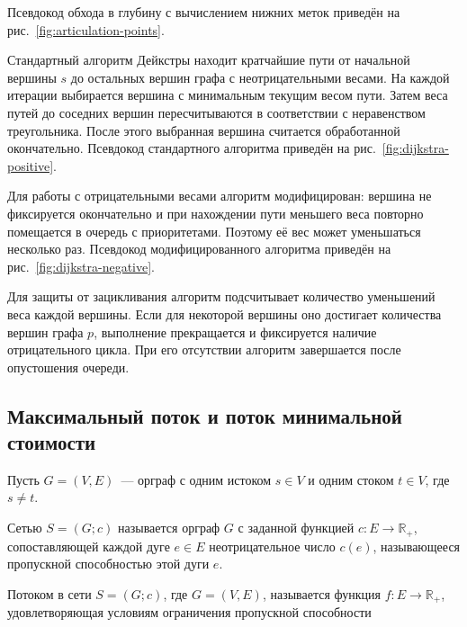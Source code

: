 Псевдокод обхода в глубину с вычислением нижних меток приведён на рис.~\ref{fig:articulation-points}.


Стандартный алгоритм Дейкстры находит кратчайшие пути от начальной вершины $s$ до остальных вершин графа с неотрицательными весами. На каждой итерации выбирается вершина с минимальным текущим весом пути. Затем веса путей до соседних вершин пересчитываются в соответствии с неравенством треугольника. После этого выбранная вершина считается обработанной окончательно. Псевдокод стандартного алгоритма приведён на рис.~\ref{fig:dijkstra-positive}.


Для работы с отрицательными весами алгоритм модифицирован: вершина не фиксируется окончательно и при нахождении пути меньшего веса повторно помещается в очередь с приоритетами. Поэтому её вес может уменьшаться несколько раз. Псевдокод модифицированного алгоритма приведён на рис.~\ref{fig:dijkstra-negative}.


Для защиты от зацикливания алгоритм подсчитывает количество уменьшений веса каждой вершины. Если для некоторой вершины оно достигает количества вершин графа $p$, выполнение прекращается и фиксируется наличие отрицательного цикла. При его отсутствии алгоритм завершается после опустошения очереди.

\subsection{Максимальный поток и поток минимальной стоимости}

Пусть $G = (V, E)$~--- орграф с одним истоком $s \in V$ и одним стоком $t \in V$, где $s \neq t$.

Сетью $S = (G; c)$ называется орграф $G$ с заданной функцией $c : E \rightarrow \mathbb{R}_{+}$, сопоставляющей каждой дуге $e \in E$ неотрицательное число $c(e)$, называющееся пропускной способностью этой дуги $e$.

Потоком в сети $S = (G; c)$, где $G = (V, E)$, называется функция $f: E \rightarrow \mathbb{R}_{+}$, удовлетворяющая условиям ограничения пропускной способности

